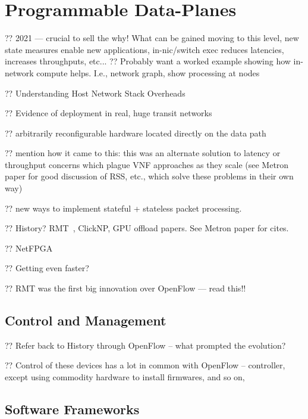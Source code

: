 \chapter{Programmable Data-Planes}

?? 2021 --- crucial to sell the why! What can be gained moving to this level, new state measures enable new applications, in-nic/switch exec reduces latencies, increases throughputs, etc...
?? Probably want a worked example showing how in-network compute helps. I.e., network graph, show processing at nodes

?? Understanding Host Network Stack Overheads~\parencite{DBLP:conf/sigcomm/CaiCVH021}

?? Evidence of deployment in real, huge transit networks~

?? arbitrarily reconfigurable hardware located directly on the data path

?? mention how it came to this: this was an alternate solution to latency or throughput concerns which plague VNF approaches as they scale (see Metron paper for good discussion of RSS, etc., which solve these problems in their own way)

?? new ways to implement stateful + stateless packet processing.

?? History? RMT~\parencite{DBLP:conf/sigcomm/BosshartGKVMIMH13}, ClickNP, GPU offload papers. See Metron paper for cites.

?? NetFPGA~\parencite{DBLP:conf/fpga/IbanezBMZ19}

?? Getting even faster?~\parencite{nokia-fp5}


?? RMT was the first big innovation over OpenFlow --- read this!!

\section{Control and Management}

?? Refer back to History through OpenFlow -- what prompted the evolution?

?? Control of these devices has a lot in common with OpenFlow -- controller, except using commodity hardware to install firmwares, and so on,

\section{Software Frameworks}

